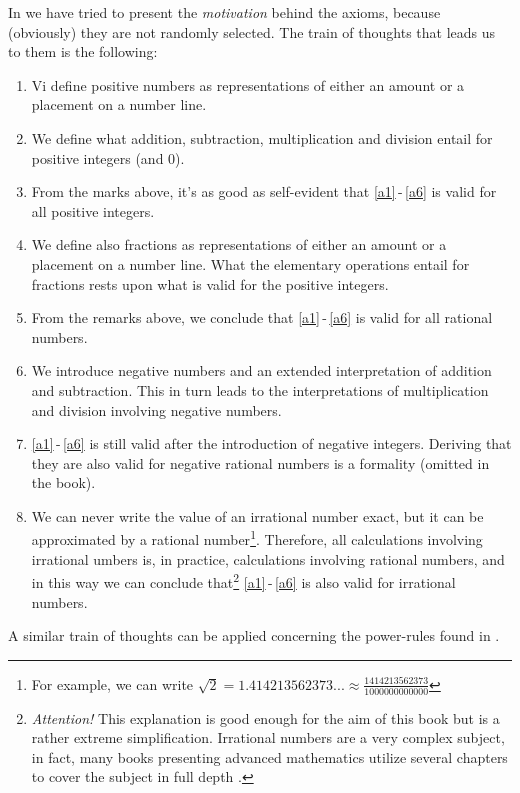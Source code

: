 \newpage
In  we have tried to present the \textsl{motivation} behind the axioms, because (obviously) they are not randomly selected. The train of thoughts that leads us to them is the following:
\begin{enumerate}
	\item Vi define positive numbers as representations of either an amount or a placement on a number line.
	\item We define what addition, subtraction, multiplication and division entail for positive integers (and 0).
	\item From the marks above, it's as good as self-evident that \eqref{a1}\,-\,\eqref{a6} is valid for all positive integers.
	\item We define also fractions as representations of either an amount or a placement on a number line. What the elementary operations entail for fractions rests upon what is valid for the positive integers.
	\item From the remarks above, we conclude that \eqref{a1}\,-\,\eqref{a6} is valid for all rational numbers.
	\item We introduce negative numbers and an extended interpretation of addition and subtraction. This in turn leads to the interpretations of multiplication and division involving negative numbers.
	\item \eqref{a1}\,-\,\eqref{a6} is still valid after the introduction of negative integers. Deriving that they are also valid for negative rational numbers is a formality (omitted in the book).
	\item We can never write the value of an irrational number exact, but it can be approximated by a rational number\footnote{For example, we can write $ \sqrt{2}=1.414213562373...\approx\frac{1414213562373}{1000000000000} $}. Therefore, all calculations involving irrational umbers is, in practice, calculations involving rational numbers, and in this way we can conclude that\footnote{\textsl{Attention!} This explanation is good enough for the aim of this book but is a rather extreme simplification. Irrational numbers are a very complex subject, in fact, many books presenting advanced mathematics utilize several chapters to cover the subject in full depth .} \eqref{a1}\,-\,\eqref{a6} is also valid for irrational numbers.
\end{enumerate}
A similar train of thoughts can be applied concerning the power-rules found in . 


